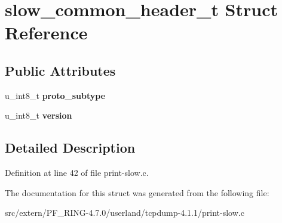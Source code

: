 \hypertarget{structslow__common__header__t}{
\section{slow\_\-common\_\-header\_\-t Struct Reference}
\label{structslow__common__header__t}
}
\subsection*{Public Attributes}
\begin{DoxyCompactItemize}
\item 
\hypertarget{structslow__common__header__t_abd2daf46e5a8652e3b1ee315f6b28b1a}{
u\_\-int8\_\-t {\bfseries proto\_\-subtype}}
\label{structslow__common__header__t_abd2daf46e5a8652e3b1ee315f6b28b1a}

\item 
\hypertarget{structslow__common__header__t_a5e4f9c4a3149968ffaf070579a7af5ac}{
u\_\-int8\_\-t {\bfseries version}}
\label{structslow__common__header__t_a5e4f9c4a3149968ffaf070579a7af5ac}

\end{DoxyCompactItemize}


\subsection{Detailed Description}


Definition at line 42 of file print-\/slow.c.



The documentation for this struct was generated from the following file:\begin{DoxyCompactItemize}
\item 
src/extern/PF\_\-RING-\/4.7.0/userland/tcpdump-\/4.1.1/print-\/slow.c\end{DoxyCompactItemize}
